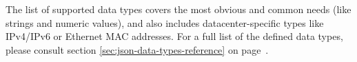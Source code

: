 \documentclass[deska]{subfiles}
\begin{document}
The list of supported data types covers the most obvious and common needs (like strings and numeric values), and also
includes datacenter-specific types like IPv4/IPv6 or Ethernet MAC addresses.  For a full list of the defined data types,
please consult section \ref{sec:json-data-types-reference} on page~\pageref{sec:json-data-types-reference}.
\end{document}
